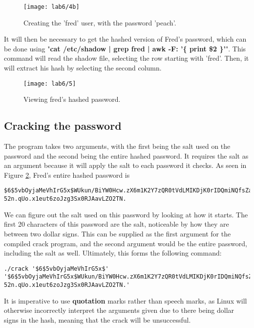 \begin{figure}[H]
    \centering
    \texttt{[image: lab6/4b]}
    \caption{Creating the 'fred' user, with the password 'peach'.}
    \label{fig:createFred}
\end{figure}

It will then be necessary to get the hashed version of Fred's password, which can be done using
"\textbf{cat /etc/shadow | grep fred | awk -F: '\{ print \$2 \}'}".
This command will read the shadow file, selecting the row starting with 'fred'.
Then, it will extract his hash by selecting the second column.

\begin{figure}[H]
    \centering
    \texttt{[image: lab6/5]}
    \caption{Viewing fred's hashed password.}
    \label{fig:viewFredHash}
\end{figure}

\subsection{Cracking the password}\label{subsec:cracking-the-password}
The program takes two arguments, with the first being the salt used on the password and the
second being the entire hashed password.
It requires the salt as an argument because it will apply the salt to each password it checks.
As seen in Figure \ref{fig:viewFredHash}, Fred's entire hashed password is

\begin{verbatim}
$6$5vbOyjaMeVhIrG5x$WUkun/BiYW0Hcw.zX6m1K2Y7zQR0tVdLMIKDjK0rIDQmiNQfsZa
52n.qUo.x1eut6zoJzg3Sx0RJAavLZO2TN.
\end{verbatim}

We can figure out the salt used on this password by looking at how it starts.
The first 20 characters of this password are the salt, noticeable by how they are between two dollar signs.
This can be supplied as the first argument for the compiled crack program, and the second argument would be the
entire password, including the salt as well.
Ultimately, this forms the following command:

\begin{verbatim}
./crack '$6$5vbOyjaMeVhIrG5x$'
'$6$5vbOyjaMeVhIrG5x$WUkun/BiYW0Hcw.zX6m1K2Y7zQR0tVdLMIKDjK0rIDQmiNQfsZa
52n.qUo.x1eut6zoJzg3Sx0RJAavLZO2TN.'
\end{verbatim}

It is imperative to use \textbf{quotation} marks rather than speech marks, as Linux will otherwise incorrectly
interpret the arguments given due to there being dollar signs in the hash, meaning that the crack will be
unsuccessful.

